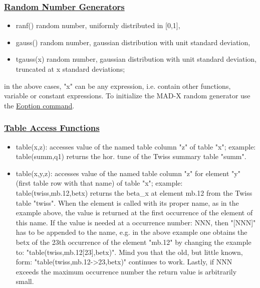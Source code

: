 \subsubsection{\href{random}{Random Number Generators}}
\label{subsubsec:random}
\begin{itemize}
	\item ranf() random number, uniformly distributed in [0,1], 
	\item gauss() random number, gaussian distribution with unit standard deviation, 
	\item tgauss(x) random number, gaussian distribution with unit
          standard deviation, truncated at x standard deviations;  
\end{itemize} 

in the above cases, "x" can be any expression, i.e. contain other
functions, variable or constant expressions. To initialize the MAD-X
random generator use the
\href{../error/error_option.html#EOPTION}{Eoption command}.  

\subsubsection{\href{table}{Table Access Functions}}
\label{subsubsec:table}

\begin{itemize}
	\item table(x,z): accesses value of the named table column "z"
          of table "x"; example: table(summ,q1) returns the hor. tune of
          the Twiss summary table "summ".  
	\item table(x,y,z): accesses value of the named table column "z"
          for element "y" (first table row with that name) of table "x";
          example: table(twiss,mb.12,betx) returns the beta\_x at
          element mb.12 from the Twiss table "twiss".   When the element
          is called with its proper name, as in the example above, the
          value is returned at the first occurrence of the element of
          this name. If the value is needed at a occurrence number: NNN,
          then "[NNN]" has to be appended to the name, e.g. in the above
          example one obtains the betx of the 23th occurrence of the
          element "mb.12" by changing the example to:
          "table(twiss,mb.12[23],betx)". Mind you that the old, but
          little known, form: "table(twiss,mb.12-\textgreater 23,betx)"
          continues to work. Lastly, if NNN exceeds the maximum
          occurrence number the return value is arbitrarily small.  
\end{itemize}

